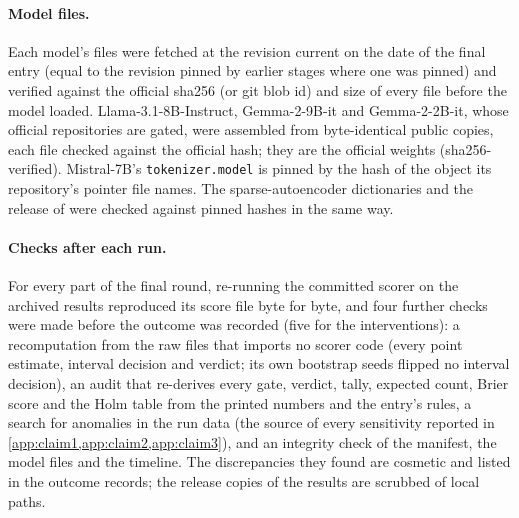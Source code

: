 \paragraph{Model files.} Each model's files were fetched at the revision current on the date of the final entry (equal to the revision pinned by earlier stages where one was pinned) and verified against the official sha256 (or git blob id) and size of every file before the model loaded. Llama-3.1-8B-Instruct, Gemma-2-9B-it and Gemma-2-2B-it, whose official repositories are gated, were assembled from byte-identical public copies, each file checked against the official hash; they are the official weights (sha256-verified). Mistral-7B's \texttt{tokenizer.model} is pinned by the hash of the object its repository's pointer file names. The sparse-autoencoder dictionaries and the release of \citet{prakash2025lookbacks} were checked against pinned hashes in the same way.

\paragraph{Checks after each run.} For every part of the final round, re-running the committed scorer on the archived results reproduced its score file byte for byte, and four further checks were made before the outcome was recorded (five for the interventions): a recomputation from the raw files that imports no scorer code (every point estimate, interval decision and verdict; its own bootstrap seeds flipped no interval decision), an audit that re-derives every gate, verdict, tally, expected count, Brier score and the Holm table from the printed numbers and the entry's rules, a search for anomalies in the run data (the source of every sensitivity reported in \cref{app:claim1,app:claim2,app:claim3}), and an integrity check of the manifest, the model files and the timeline. The discrepancies they found are cosmetic and listed in the outcome records; the release copies of the results are scrubbed of local paths.
